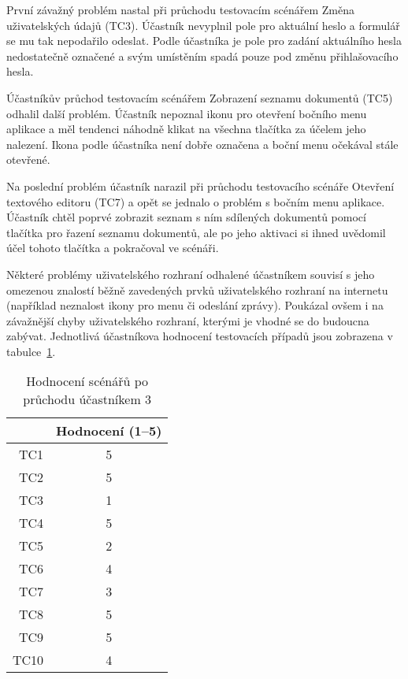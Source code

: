 První závažný problém nastal při průchodu testovacím scénářem Změna uživatelských údajů (TC3).
Účastník nevyplnil pole pro aktuální heslo a formulář se mu tak nepodařilo odeslat.
Podle účastníka je pole pro zadání aktuálního hesla nedostatečně označené a svým umístěním spadá pouze pod změnu přihlašovacího hesla.

Účastníkův průchod testovacím scénářem Zobrazení seznamu dokumentů (TC5) odhalil další problém.
Účastník nepoznal ikonu pro otevření bočního menu aplikace a měl tendenci náhodně klikat na všechna tlačítka za účelem jeho nalezení.
Ikona podle účastníka není dobře označena a boční menu očekával stále otevřené.

Na poslední problém účastník narazil při průchodu testovacího scénáře Otevření textového editoru (TC7) a opět se jednalo o problém s bočním menu aplikace.
Účastník chtěl poprvé zobrazit seznam s ním sdílených dokumentů pomocí tlačítka pro řazení seznamu dokumentů, ale po jeho aktivaci si ihned uvědomil účel tohoto tlačítka a pokračoval ve scénáři.

Některé problémy uživatelského rozhraní odhalené účastníkem souvisí s jeho omezenou znalostí běžně zavedených prvků uživatelského rozhraní na internetu (například neznalost ikony pro menu či odeslání zprávy).
Poukázal ovšem i na závažnější chyby uživatelského rozhraní, kterými je vhodné se do budoucna zabývat.
Jednotlivá účastníkova hodnocení testovacích případů jsou zobrazena v tabulce~\ref{tab:poPrůchoduÚčastníkem3}.

\begin{table}[ht!]
    \centering
    \caption{Hodnocení scénářů po průchodu účastníkem 3}
    \label{tab:poPrůchoduÚčastníkem3}
    \begin{tabular}{r|c}
        & Hodnocení (1--5) \\ \hline
        TC1 & 5 \\
        TC2 & 5 \\
        TC3 & 1 \\
        TC4 & 5 \\
        TC5 & 2 \\
        TC6 & 4 \\
        TC7 & 3 \\
        TC8 & 5 \\
        TC9 & 5 \\
        TC10 & 4 \\
    \end{tabular}
\end{table}

